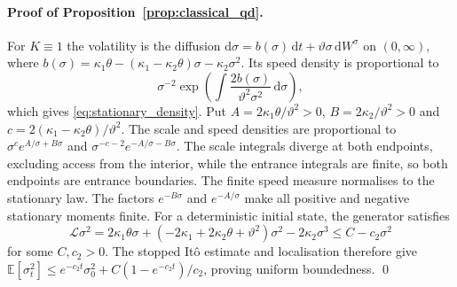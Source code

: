 \documentclass[11pt,a4paper]{article}
\theoremstyle{definition}
\newcommand{\D}{\mathrm{d}}
\newcommand{\E}{\mathbb{E}}
\begin{document}
\paragraph{Proof of Proposition~\ref{prop:classical_qd}.} For $K\equiv1$ the volatility is the diffusion $\D\sigma=b(\sigma)\,\D t+\vartheta\sigma\,\D W^\sigma$ on $(0,\infty)$, where $b(\sigma)=\kappa_1\theta-(\kappa_1-\kappa_2\theta)\sigma-\kappa_2\sigma^2$. Its speed density is proportional to
\begin{equation*}
\sigma^{-2}\exp\left(\int \frac{2b(\sigma)}{\vartheta^2\sigma^2}\,\D\sigma\right),
\end{equation*}
which gives \eqref{eq:stationary_density}. Put $A=2\kappa_1\theta/\vartheta^2>0$, $B=2\kappa_2/\vartheta^2>0$ and $c=2(\kappa_1-\kappa_2\theta)/\vartheta^2$. The scale and speed densities are proportional to $\sigma^c e^{A/\sigma+B\sigma}$ and $\sigma^{-c-2}e^{-A/\sigma-B\sigma}$. The scale integrals diverge at both endpoints, excluding access from the interior, while the entrance integrals are finite, so both endpoints are entrance boundaries. The finite speed measure normalises to the stationary law. The factors $e^{-B\sigma}$ and $e^{-A/\sigma}$ make all positive and negative stationary moments finite.
For a deterministic initial state, the generator satisfies
\begin{equation*}
\mathcal L\sigma^2=2\kappa_1\theta\sigma+
(-2\kappa_1+2\kappa_2\theta+\vartheta^2)\sigma^2-2\kappa_2\sigma^3
\le C-c_2\sigma^2
\end{equation*}
for some $C,c_2>0$. The stopped It\^o estimate and localisation therefore give
$\E[\sigma_t^2]\le e^{-c_2t}\sigma_0^2+C(1-e^{-c_2t})/c_2$, proving uniform boundedness. \qed
\end{document}
